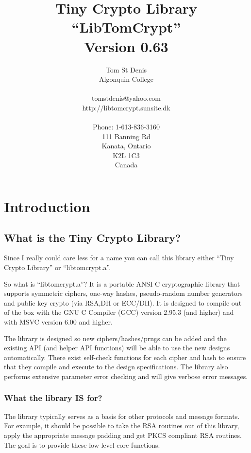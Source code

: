 \documentclass{book}
\begin{document}
\title{Tiny Crypto Library \\ ``LibTomCrypt'' \\ Version 0.63}
\author{Tom St Denis \\
Algonquin College \\
\\
tomstdenis@yahoo.com \\
http://libtomcrypt.sunsite.dk \\ \\
Phone: 1-613-836-3160\\
111 Banning Rd \\
Kanata, Ontario \\
K2L 1C3 \\
Canada 
}
\maketitle
\newpage
\tableofcontents
\chapter{Introduction}
\section{What is the Tiny Crypto Library?}
Since I really could care less for a name you can call this library either ``Tiny Crypto Library'' or ``libtomcrypt.a''.  

So what is ``libtomcrypt.a''?  It is a portable ANSI C cryptographic library that supports
symmetric ciphers, one-way hashes, pseudo-random number generators and public key crypto (via RSA,DH or ECC/DH).  It is 
designed to compile out of the box with the GNU C Compiler (GCC) version 2.95.3 (and higher) and with MSVC version 6.00 and
higher.

The library is designed so new ciphers/hashes/prngs can be added and the existing API (and helper API functions) will 
be able to use the new designs automatically.  There exist self-check functions for each cipher and hash to ensure that
they compile and execute to the design specifications.  The library also performs extensive parameter error checking
and will give verbose error messages.

\subsection{What the library {\bf IS} for?}

The library typically serves as a basis for other protocols and message formats.  For example, it should be possible to 
take the RSA routines out of this library, apply the appropriate message padding and get PKCS compliant RSA routines.  The
goal is to provide these low level core functions.  
\end{document}
